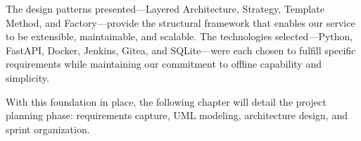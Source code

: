 The design patterns presented—Layered Architecture, Strategy, Template Method, and Factory—provide the structural framework that enables our service to be extensible, maintainable, and scalable. The technologies selected—Python, FastAPI, Docker, Jenkins, Gitea, and SQLite—were each chosen to fulfill specific requirements while maintaining our commitment to offline capability and simplicity.

With this foundation in place, the following chapter will detail the project planning phase: requirements capture, UML modeling, architecture design, and sprint organization.
